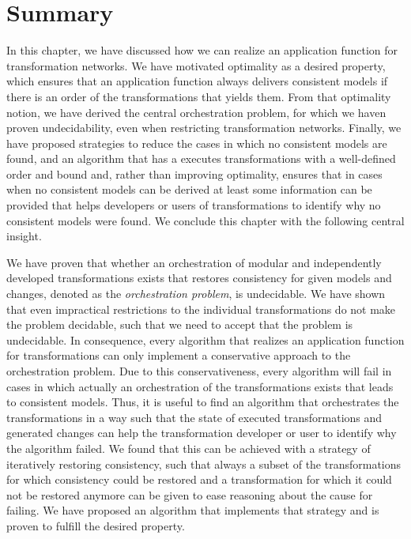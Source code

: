 \section{Summary}

In this chapter, we have discussed how we can realize an application function for transformation networks.
We have motivated optimality as a desired property, which ensures that an application function always delivers consistent models if there is an order of the transformations that yields them. 
From that optimality notion, we have derived the central orchestration problem, for which we haven proven undecidability, even when restricting transformation networks.
Finally, we have proposed strategies to reduce the cases in which no consistent models are found, and an algorithm that has a executes transformations with a well-defined order and bound and, rather than improving optimality, ensures that in cases when no consistent models can be derived at least some information can be provided that helps developers or users of transformations to identify why no consistent models were found.
We conclude this chapter with the following central insight.

\begin{insight}[Orchestration]
    We have proven that whether an orchestration of modular and independently developed transformations exists that restores consistency for given models and changes, denoted as the \emph{orchestration problem}, is undecidable.
    We have shown that even impractical restrictions to the individual transformations do not make the problem decidable, such that we need to accept that the problem is undecidable.
    In consequence, every algorithm that realizes an application function for transformations can only implement a conservative approach to the orchestration problem.
    Due to this conservativeness, every algorithm will fail in cases in which actually an orchestration of the transformations exists that leads to consistent models.
    Thus, it is useful to find an algorithm that orchestrates the transformations in a way such that the state of executed transformations and generated changes can help the transformation developer or user to identify why the algorithm failed.
    We found that this can be achieved with a strategy of iteratively restoring consistency, such that always a subset of the transformations for which consistency could be restored and a transformation for which it could not be restored anymore can be given to ease reasoning about the cause for failing.
    We have proposed an algorithm that implements that strategy and is proven to fulfill the desired property.
\end{insight}